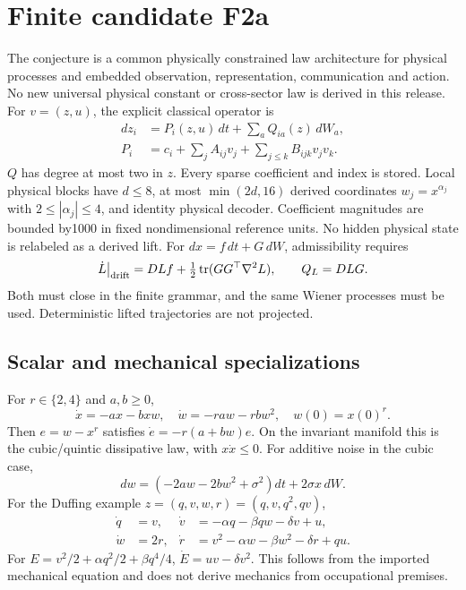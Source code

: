 \section{Finite candidate F2a}
The conjecture is a common physically constrained law architecture for physical processes and embedded observation, representation, communication and action. No new universal physical constant or cross-sector law is derived in this release.
For $v=(z,u)$, the explicit classical operator is
\begin{align}
 dz_i&=P_i(z,u)\,dt+\sum_a Q_{ia}(z)\,dW_a,\\
 P_i&=c_i+\sum_j A_{ij}v_j+\sum_{j\leq k} B_{ijk}v_jv_k.
\end{align}
$Q$ has degree at most two in $z$. Every sparse coefficient and index is stored. Local physical blocks have $d\leq8$, at most $\min(2d,16)$ derived coordinates $w_j=x^{\alpha_j}$ with $2\leq|\alpha_j|\leq4$, and identity physical decoder. Coefficient magnitudes are bounded by1000 in fixed nondimensional reference units. No hidden physical state is relabeled as a derived lift.
For $dx=f\,dt+G\,dW$, admissibility requires
\[
 \dot L\big|_{\rm drift}=DLf+\tfrac12\operatorname{tr}(GG^\top\nabla^2L),\qquad Q_L=DLG.
\]
Both must close in the finite grammar, and the same Wiener processes must be used. Deterministic lifted trajectories are not projected.

\subsection{Scalar and mechanical specializations}
For $r\in\{2,4\}$ and $a,b\geq0$,
\[
 \dot x=-ax-bxw,\quad\dot w=-ra w-rb w^2,\quad w(0)=x(0)^r.
\]
Then $e=w-x^r$ satisfies $\dot e=-r(a+bw)e$. On the invariant manifold this is the cubic/quintic dissipative law, with $x\dot x\leq0$. For additive noise in the cubic case,
\[
 dw=(-2aw-2bw^2+\sigma^2)dt+2\sigma x\,dW.
\]
For the Duffing example $z=(q,v,w,r)=(q,v,q^2,qv)$,
\begin{align}
 \dot q&=v,&\dot v&=-\alpha q-\beta qw-\delta v+u,\\
 \dot w&=2r,&\dot r&=v^2-\alpha w-\beta w^2-\delta r+qu.
\end{align}
For $E=v^2/2+\alpha q^2/2+\beta q^4/4$, $\dot E=uv-\delta v^2$. This follows from the imported mechanical equation and does not derive mechanics from occupational premises.

